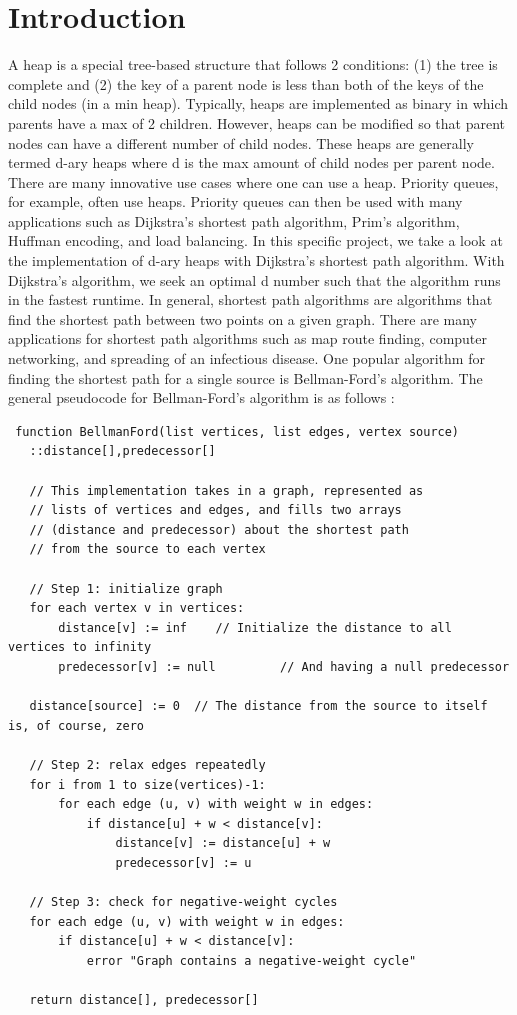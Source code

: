 \documentclass[a4paper,10pt]{article}
\begin{document}
\section{Introduction} 
A heap is a special tree-based structure that follows 2 conditions: (1) the tree is complete and (2) the key of a parent node is less than both of the keys of the child nodes (in a min heap). Typically, heaps are implemented as binary in which parents have a max of 2 children. However, heaps can be modified so that parent nodes can have a different number of child nodes. These heaps are generally termed d-ary heaps where d is the max amount of child nodes per parent node. \smallbreak
There are many innovative use cases where one can use a heap. Priority queues, for example, often use heaps. Priority queues can then be used with many applications such as Dijkstra's shortest path algorithm, Prim's algorithm, Huffman encoding, and load balancing. In this specific project, we take a look at the implementation of d-ary heaps with Dijkstra's shortest path algorithm. With Dijkstra's algorithm, we seek an optimal d number such that the algorithm runs in the fastest runtime. \smallbreak
In general, shortest path algorithms are algorithms that find the shortest path between two points on a given graph. There are many applications for shortest path algorithms such as map route finding, computer networking, and spreading of an infectious disease. One popular algorithm for finding the shortest path for a single source is Bellman-Ford's algorithm. The general pseudocode for Bellman-Ford's algorithm is as follows \cite{bellman}:
\begin{verbatim}
 function BellmanFord(list vertices, list edges, vertex source)
   ::distance[],predecessor[]
   
   // This implementation takes in a graph, represented as
   // lists of vertices and edges, and fills two arrays
   // (distance and predecessor) about the shortest path
   // from the source to each vertex
   
   // Step 1: initialize graph
   for each vertex v in vertices:
       distance[v] := inf    // Initialize the distance to all vertices to infinity
       predecessor[v] := null         // And having a null predecessor
   
   distance[source] := 0  // The distance from the source to itself is, of course, zero
   
   // Step 2: relax edges repeatedly
   for i from 1 to size(vertices)-1:
       for each edge (u, v) with weight w in edges:
           if distance[u] + w < distance[v]:
               distance[v] := distance[u] + w
               predecessor[v] := u
   
   // Step 3: check for negative-weight cycles
   for each edge (u, v) with weight w in edges:
       if distance[u] + w < distance[v]:
           error "Graph contains a negative-weight cycle"
   
   return distance[], predecessor[]
\end{verbatim}
\end{document}
